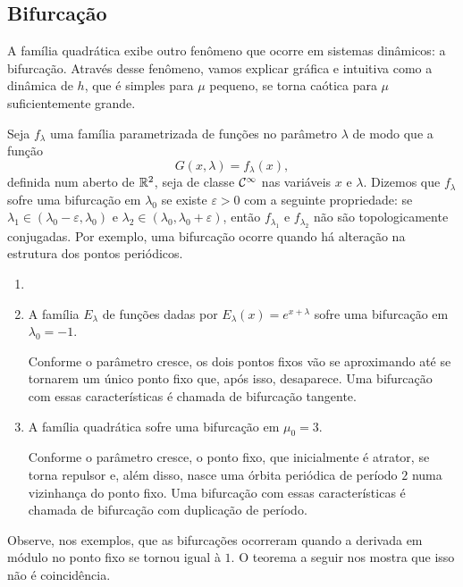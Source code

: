 \subsection{Bifurcação}

A família quadrática exibe outro fenômeno que ocorre em sistemas dinâmicos: a bifurcação.
Através desse fenômeno, vamos explicar gráfica e intuitiva como a dinâmica de $h$, que é simples para $\mu$ pequeno, se torna caótica para $\mu$ suficientemente grande.

Seja $f_\lambda$ uma família parametrizada de funções no parâmetro $\lambda$ de modo que a função
$$G(x, \lambda) = f_\lambda(x),$$
definida num aberto de $\mathbb{R}^2$, seja de classe $\mathcal{C}^\infty$ nas variáveis $x$ e $\lambda$.
Dizemos que $f_\lambda$ sofre uma bifurcação em $\lambda_0$ se existe $\varepsilon > 0$ com a seguinte propriedade: se $\lambda_1 \in (\lambda_0 - \varepsilon, \lambda_0)$ e $\lambda_2 \in (\lambda_0, \lambda_0 + \varepsilon)$, então $f_{\lambda_1}$ e $f_{\lambda_2}$ não são topologicamente conjugadas.
Por exemplo, uma bifurcação ocorre quando há alteração na estrutura dos pontos periódicos.

\begin{example}
\begin{enumerate}[label=\alph*)]\item[]
\item 
A família $E_\lambda$ de funções dadas por $E_\lambda(x) = e^{x + \lambda}$ sofre uma bifurcação em $\lambda_0 = -1$.

Conforme o parâmetro cresce, os dois pontos fixos vão se aproximando até se tornarem um único ponto fixo que, após isso, desaparece. Uma bifurcação com essas características é chamada de bifurcação tangente.

\item A família quadrática sofre uma bifurcação em $\mu_0 = 3$.

Conforme o parâmetro cresce, o ponto fixo, que inicialmente é atrator, se torna repulsor e, além disso, nasce uma órbita periódica de período $2$ numa vizinhança do ponto fixo. Uma bifurcação com essas características é chamada de bifurcação com duplicação de período.
\end{enumerate}
\end{example}

Observe, nos exemplos, que as bifurcações ocorreram quando a derivada em módulo no ponto fixo se tornou igual à $1$. O teorema a seguir nos mostra que isso não é coincidência.

